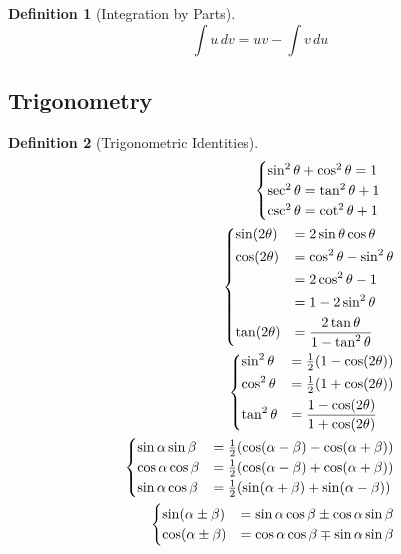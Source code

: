 \documentclass[11pt]{article}
\theoremstyle{definition}
\newtheorem{definition}{Definition}[section]
\theoremstyle{remark}
\begin{document}
\begin{definition}[Integration by Parts]
\begin{equation}
\int u\, dv = uv - \int v \, du
\end{equation}
\end{definition}


\subsection{Trigonometry}
\begin{definition}[Trigonometric Identities]
\begin{align}
\begin{cases}
\sin^2 \theta + \cos^2 \theta = 1 \\
\sec^2\theta = \tan^2\theta+1 \\
\csc^2\theta = \cot^2\theta+1
\end{cases} \\
\begin{dcases}
\sin(2\theta)&=2\sin\theta\cos\theta \\
\cos(2\theta)&=\cos^2\theta-\sin^2\theta\\
&=2\cos^2\theta-1\\
&=1-2\sin^2\theta \\
\tan(2\theta)&=\frac{2\tan\theta}{1-\tan^2\theta}
\end{dcases} \\
\begin{dcases}
\sin^2\theta&=\tfrac{1}{2}(1-\cos(2\theta))\\
\cos^2\theta&=\tfrac{1}{2}(1+\cos(2\theta))\\
\tan^2\theta&=\frac{1-\cos(2\theta)}{1+\cos(2\theta)}
\end{dcases} \\
\begin{cases}
\sin\alpha\sin\beta &= \tfrac{1}{2}(\cos(\alpha - \beta)-\cos(\alpha+\beta)) \\
\cos\alpha\cos\beta&=\tfrac{1}{2}(\cos(\alpha - \beta)+\cos(\alpha+\beta)) \\
\sin\alpha\cos\beta&=\tfrac{1}{2}(\sin(\alpha + \beta)+\sin(\alpha-\beta))
\end{cases} \\
\begin{cases}
\sin(\alpha\pm\beta)&=\sin\alpha\cos\beta\pm\cos\alpha\sin\beta \\
\cos(\alpha\pm\beta)&=\cos\alpha\cos\beta\mp\sin\alpha\sin\beta \\
\end{cases}
\end{align}
\end{definition}
\end{document}
